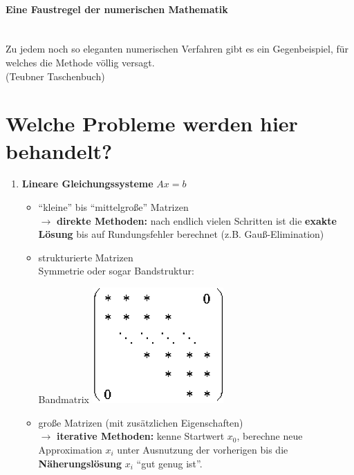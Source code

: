 \paragraph{Eine Faustregel der numerischen Mathematik}~\\
Zu jedem noch so eleganten numerischen Verfahren gibt es ein Gegenbeispiel,
für welches die Methode völlig versagt. \\
{\tiny(Teubner Taschenbuch)}

\section*{Welche Probleme werden hier behandelt?}
\begin{enumerate}
\item \textbf{Lineare Gleichungssysteme} $Ax=b$ 
  \begin{itemize}
  \item \enquote{kleine} bis \enquote{mittelgroße} Matrizen\\
    $\rightarrow$ \textbf{direkte Methoden:} nach endlich vielen
    Schritten ist die \textbf{exakte Lösung} bis auf
    Rundungsfehler berechnet (z.B. Gauß-Elimination)
  \item strukturierte Matrizen \\
    Symmetrie oder sogar Bandstruktur:
    \begin{image}{Bandmatrix}
      \includegraphics[width=5cm]{images/band.jpg}  
    \end{image}
    
    
  \item große Matrizen (mit zusätzlichen Eigenschaften)\\
    $\rightarrow$ \textbf{iterative Methoden:} kenne Startwert
    $x_0$, berechne neue Approximation $x_i$ unter
    Ausnutzung der vorherigen bis die
    \textbf{Näherungslösung} $x_i$ \enquote{gut genug ist}.
  \end{itemize}
  

\end{enumerate}
